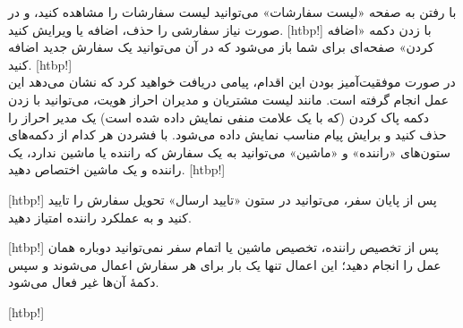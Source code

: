      با رفتن به صفحه «لیست سفارشات» می‌توانید لیست سفارشات را مشاهده کنید، و در صورت نیاز سفارشی را حذف، اضافه یا ویرایش کنید.
    [htbp!]
\newpage
         با زدن دکمه «اضافه کردن» صفحه‌ای برای شما باز می‌شود که در آن می‌توانید یک سفارش جدید اضافه کنید.
[htbp!]
\\
در صورت موفقیت‌آمیز بودن این اقدام، پیامی دریافت خواهید کرد که نشان می‌دهد این عمل انجام گرفته است.
     مانند لیست مشتریان و مدیران احراز هویت، می‌توانید با زدن دکمه پاک کردن (که با یک علامت منفی نمایش داده شده است) یک مدیر احراز را حذف کنید و برایش پیام مناسب نمایش داده می‌شود.
     با فشردن هر کدام از دکمه‌های ستون‌های «راننده» و «ماشین» می‌توانید به یک سفارش که راننده یا ماشین ندارد، یک راننده و یک ماشین اختصاص دهید.
[htbp!]

[htbp!]
 پس از پایان سفر، می‌توانید در ستون «تایید ارسال» تحویل سفارش را تایید کنید و به عملکرد راننده امتیاز دهید.

[htbp!]
 پس از تخصیص راننده، تخصیص ماشین یا اتمام سفر نمی‌توانید دوباره همان عمل را انجام دهید؛ این اعمال تنها یک بار برای هر سفارش اعمال می‌شوند و سپس دکمهٔ آن‌ها غیر فعال می‌شود.

[htbp!]


